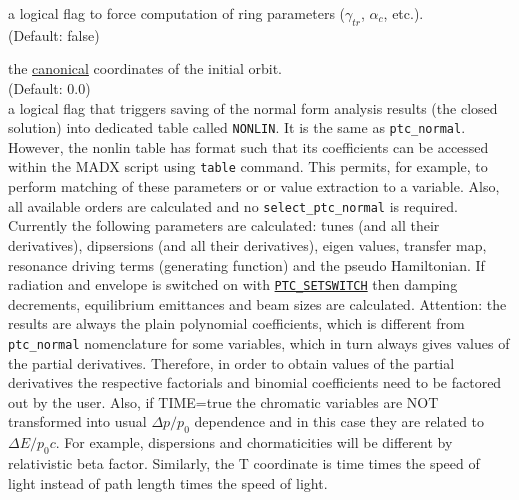 \begin{madlist}
   a logical flag to force computation of ring
  parameters ($\gamma_{tr}$, $\alpha_c$, etc.). \\ 
  (Default: false)

   the
  \hyperref[subsec:tables-canon]{canonical} coordinates of the initial
  orbit. \\ (Default: 0.0) \\
  
   a logical flag that triggers saving of the normal form analysis results
  (the closed solution) into dedicated table called \texttt{NONLIN}. It is the same as  \texttt{ptc\_normal}.
   However, the nonlin table has format such that its coefficients can be accessed within the MADX script using 
   \texttt{table} command. This permits, for example, to perform matching of these parameters or or value extraction to a variable. 
   Also, all available orders are calculated and 
   no \texttt{select\_ptc\_normal} is required.
   Currently the following parameters are calculated: tunes (and all their derivatives), 
   dipsersions (and all their derivatives), eigen values, transfer map, 
   resonance driving terms (generating function) and the pseudo Hamiltonian.
   If radiation and envelope is switched on with \hyperref[sec:ptc-setswitch]{\texttt{PTC\_SETSWITCH}}
   then damping decrements, equilibrium emittances and beam sizes are calculated.
   Attention: the results are always the plain polynomial coefficients, 
   which is different from  \texttt{ptc\_normal} nomenclature for some variables, 
   which in turn always gives values of the partial derivatives.
   Therefore, in order to obtain values of the partial derivatives the respective factorials 
   and binomial coefficients need to be factored out by the user. 
   Also, if TIME=true the chromatic variables are NOT transformed into usual $\Delta p/p_0$ dependence
   and in this case they are related to $\Delta E/p_0 c$. For example, dispersions and chormaticities will be 
   different by relativistic beta factor. Similarly, the T coordinate is time times the speed of light 
   instead of path length times the speed of light.
   

\end{madlist}
